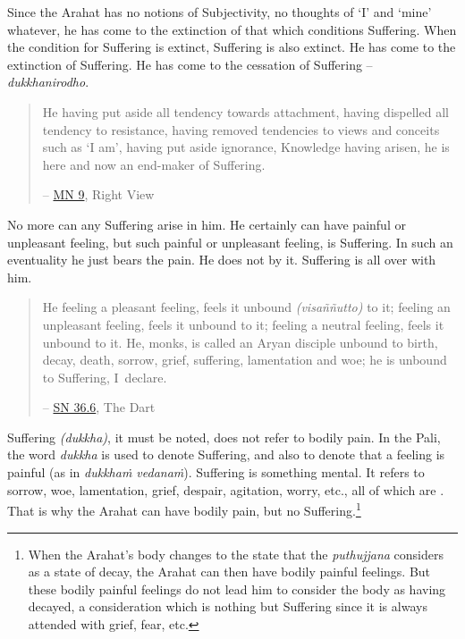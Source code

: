 Since the Arahat has no notions of Subjectivity, no thoughts of `I' and `mine' whatever, he has come to the extinction of that which conditions Suffering. When the condition for Suffering is extinct, Suffering is also extinct. He has come to the extinction of Suffering. He has come to the cessation of Suffering -- \emph{dukkhanirodho}.

\enlargethispage{\baselineskip}

\begin{quote}
He having put aside all tendency towards attachment, having dispelled all tendency to resistance, having removed tendencies to views and conceits such as `I am', having put aside ignorance, Knowledge having arisen, he is here and now an end-maker of Suffering.

 -- \href{https://suttacentral.net/mn9/en/bodhi}{MN 9}, Right View
\end{quote}

No more can any Suffering arise in him. He certainly can have painful or unpleasant feeling, but such painful or unpleasant feeling, is  Suffering. In such an eventuality he just bears the pain. He does not  by it. Suffering is all over with him.

\begin{quote}
He feeling a pleasant feeling, feels it unbound \emph{(visaññutto)} to it; feeling an unpleasant feeling, feels it unbound to it; feeling a neutral feeling, feels it unbound to it. He, monks, is called an Aryan disciple unbound to birth, decay, death, sorrow, grief, suffering, lamentation and woe; he is unbound to Suffering, I~declare.

 -- \href{https://suttacentral.net/sn36.6/en/bodhi}{SN 36.6}, The Dart
\end{quote}

Suffering \emph{(dukkha)}, it must be noted, does not refer to bodily pain. In the Pali, the word \emph{dukkha} is used to denote Suffering, and also to denote that a feeling is painful (as in \emph{dukkhaṁ vedanaṁ}). Suffering is something mental. It refers to sorrow, woe, lamentation, grief, despair, agitation, worry, etc., all of which are . That is why the Arahat can have bodily pain, but no Suffering.\footnote{When the Arahat's body changes to the state that the \emph{puthujjana} considers as a state of decay, the Arahat can then have bodily painful feelings. But these bodily painful feelings do not lead him to consider the body as having decayed, a consideration which is nothing but Suffering since it is always attended with grief, fear, etc.}

